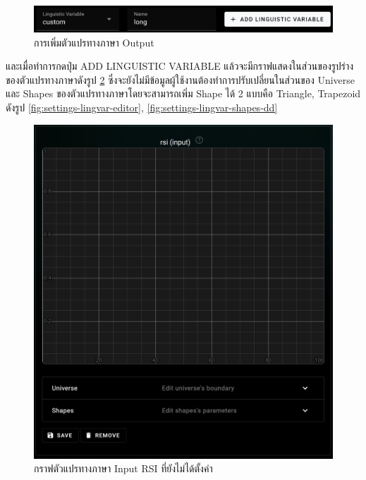 \begin{figure}[ht]
    \centering
    \includegraphics[width=\textwidth]{images/web-tuts/settings-lingvars-custom.PNG}
    \caption{การเพิ่มตัวแปรทางภาษา Output}
    \label{fig:settings-lingvars-custom}
\end{figure}
\FloatBarrier
และเมื่อทำการกดปุ่ม ADD LINGUISTIC VARIABLE แล้วจะมีกราฟแสดงในส่วนของรูปร่างของตัวแปรทางภาษาดังรูป \ref{fig:settings-rsi-init} ซึ่งจะยังไม่มีข้อมูลผู้ใช้งานต้องทำการปรับเปลี่ยนในส่วนของ Universe และ Shapes ของตัวแปรทางภาษาโดยจะสามารถเพิ่ม Shape ได้ 2 แบบคือ Triangle, Trapezoid ดังรูป \ref{fig:settings-lingvar-editor}, \ref{fig:settings-lingvar-shapes-dd}
\begin{figure}[ht]
    \centering
    \includegraphics[scale=0.5]{images/web-tuts/settings-rsi-init.PNG}
    \caption{กราฟตัวแปรทางภาษา Input RSI ที่ยังไม่ได้ตั้งค่า}
    \label{fig:settings-rsi-init}
\end{figure}
